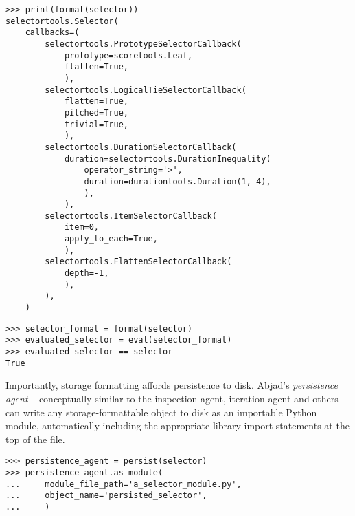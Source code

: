 \begin{abjadbookoutput}
\begin{singlespacing}
\vspace{-0.5\baselineskip}
\begin{verbatim}
>>> print(format(selector))
selectortools.Selector(
    callbacks=(
        selectortools.PrototypeSelectorCallback(
            prototype=scoretools.Leaf,
            flatten=True,
            ),
        selectortools.LogicalTieSelectorCallback(
            flatten=True,
            pitched=True,
            trivial=True,
            ),
        selectortools.DurationSelectorCallback(
            duration=selectortools.DurationInequality(
                operator_string='>',
                duration=durationtools.Duration(1, 4),
                ),
            ),
        selectortools.ItemSelectorCallback(
            item=0,
            apply_to_each=True,
            ),
        selectortools.FlattenSelectorCallback(
            depth=-1,
            ),
        ),
    )
\end{verbatim}
\begin{verbatim}
>>> selector_format = format(selector)
>>> evaluated_selector = eval(selector_format)
>>> evaluated_selector == selector
True
\end{verbatim}
\end{singlespacing}
\end{abjadbookoutput}

\noindent Importantly, storage formatting affords persistence to disk. Abjad's
\emph{persistence agent} -- conceptually similar to the inspection agent,
iteration agent and others -- can write any storage-formattable object to disk
as an importable Python module, automatically including the appropriate library
import statements at the top of the file.

\begin{comment}
<abjad>
persistence_agent = persist(selector)
persistence_agent.as_module(
    module_file_path='a_selector_module.py',
    object_name='persisted_selector',
    )
</abjad>
\end{comment}

\begin{abjadbookoutput}
\begin{singlespacing}
\vspace{-0.5\baselineskip}
\begin{verbatim}
>>> persistence_agent = persist(selector)
>>> persistence_agent.as_module(
...     module_file_path='a_selector_module.py',
...     object_name='persisted_selector',
...     )
\end{verbatim}
\end{singlespacing}
\end{abjadbookoutput}

